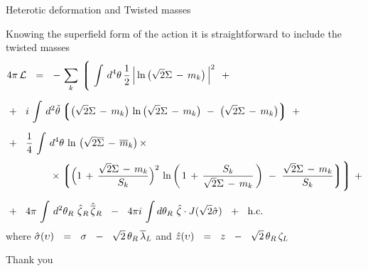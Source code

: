 \documentclass{beamer}
\begin{document}
\begin{frame}{Heterotic deformation and Twisted masses}

	Knowing the superfield form of the action it is straightforward
	to include the twisted masses
{\footnotesize
\begin{align*}
%
	& 4\pi\, \cell    ~~=~~     
			-\, \sum_k\, \Bigg\lgroup\,
			\int\, d^4\theta\, \frac{1}{2}\, \Big| \ln \big(\sqrt{2}\Sigma \,-\, m_k \big)\, \Big|^2
			~~+
	\\[2mm]
%
			&
			+~~
			i\, \int\, d^2\tilde\theta 
			\lgr
			\big( \sqrt{2}\Sigma \,-\, m_k \big)\, \ln \big( \sqrt{2}\Sigma \,-\, m_k \big)  ~-~ 
					\big( \sqrt{2}\Sigma \,-\, m_k \big)
			\rgr \!\!
			~~+
	\\[2mm]
%
			&
			+~~ 
			\frac{1}{4}\, \int\, d^4\theta\, \ln\, \big( \sqrt{2}\ov\Sigma \,-\, \ov m{}_k \big)\, \times
	\\[1mm]
%
			&
			\qquad\qquad~
			\times
			\bigg\lgroup \Big( 1 \,+\, \frac{\sqrt{2}\Sigma \,-\, m_k}{S_k} \Big)^2\,
				\ln \left(\, 1 \,+\, \frac{S_k}{\sqrt{2}\Sigma \,-\, m_k} \,\right) ~-~
				\frac{\sqrt{2}\Sigma \,-\, m_k}{S_k} \bigg\rgroup \Bigg\rgroup \!\!
			~~+
	\\[2mm]
%
			&
			+~~
			4\pi\, \int\, d^2\theta_R\,\, \hzeta_R\, \hbzeta_R
			~~-~~
			4\pi i\, \int d\theta_R\,\, \hzeta\cdot J(\sqrt{2}\hsigma)
			~~+~~
			\text{h.c.}
\end{align*}
}
	where
{\footnotesize
$
	\hat\sigma{}(\upsilon)    ~~=~~    \sigma  ~~-~~  \sqrt{2}\,\theta_R\,\overline\lambda{}_L
$
}
	and
{\footnotesize
$
	\hat z{}(\upsilon)    ~~=~~    z  ~~-~~  \sqrt{2}\,\theta_R\,\zeta_L\
$
}

\end{frame}


\begin{frame}{}

\fontsize{70pt}{70pt}\selectfont
\begin{center}
        Thank you
\end{center}

\end{frame}
\end{document}
